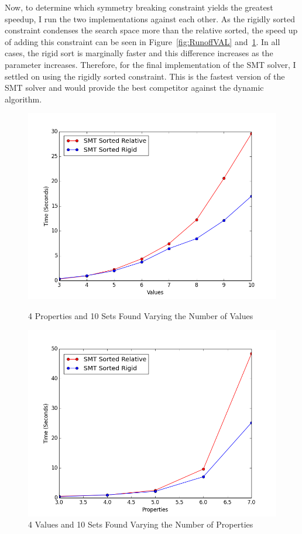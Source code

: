 \documentclass[pageno]{jpaper}
\begin{document}




Now, to determine which symmetry breaking constraint yields the greatest speedup, I run the two implementations against each other. As the rigidly sorted constraint condenses the search space more than the relative sorted, the speed up of adding this constraint can be seen in Figure~\ref{fig:RunoffVAL} and~\ref{fig:RunoffPROP}. In all cases, the rigid sort is marginally faster and this difference increases as the parameter increases. Therefore, for the final implementation of the SMT solver, I settled on using the rigidly sorted constraint. This is the fastest version of the SMT solver and would provide the best competitor against the dynamic algorithm.



\begin{figure}[htbb]
\begin{minipage}[b]{0.5\linewidth}
\centering
\includegraphics[width=.75\linewidth]{RunoffSMTVAL-v345678910p4n10.png}
\caption{4 Properties and 10 Sets Found Varying the Number of Values}
\label{fig:RunoffVAL}
\end{minipage}
\hspace{0.5cm}
\begin{minipage}[b]{0.5\linewidth}
\centering
\includegraphics[width=.75\linewidth]{RunoffSMTPROP-v4p34567n10.png}
\caption{4 Values and 10 Sets Found Varying the Number of Properties}
\label{fig:RunoffPROP}
\end{minipage}
\end{figure}
\end{document}
